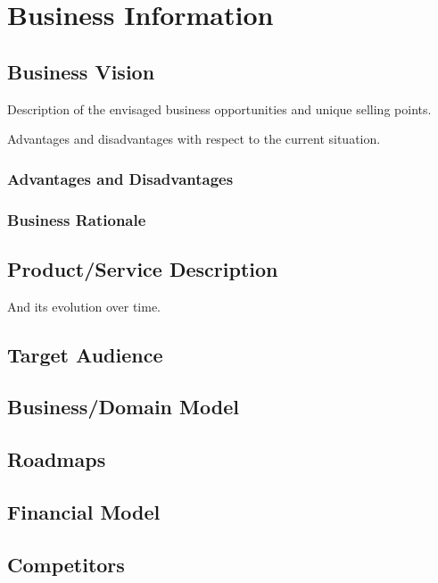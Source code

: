 \chapter{Business Information}

\section{Business Vision}

Description of the envisaged business opportunities and unique selling points.

Advantages and disadvantages with respect to the current situation.

\subsection{Advantages and Disadvantages}

\subsection{Business Rationale}

\section{Product/Service Description}

And its evolution over time.

\section{Target Audience}

\section{Business/Domain Model}

\section{Roadmaps}

\section{Financial Model}

\section{Competitors}
